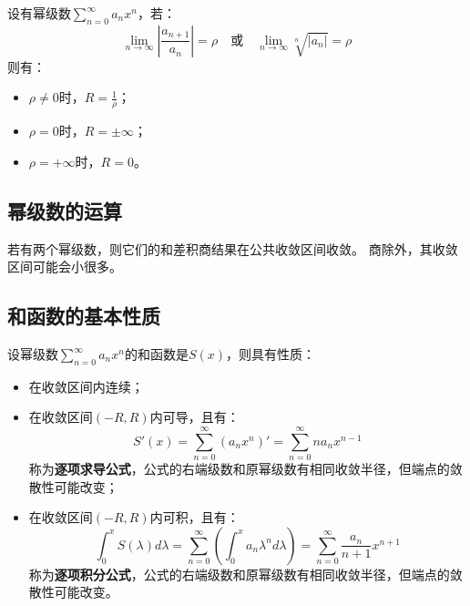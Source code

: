 \begin{theorem}[收敛半径定理]
设有幂级数$\sum_{n=0}^{\infty}{a_nx^n}$，若：
\[
\underset{n\rightarrow \infty}{\lim}\left| \frac{a_{n+1}}{a_n} \right|=\rho \quad \text{或} \quad \underset{n\rightarrow \infty}{\lim}\sqrt[n]{\left| a_n \right|}=\rho
\]
则有：
\begin{itemize}
    \item $\rho \ne 0$时，$R=\frac{1}{\rho}$；
    \item $\rho =0$时，$R=\pm \infty $；
    \item $\rho =+\infty $时，$R=0$。
\end{itemize}
\end{theorem}

\subsection{幂级数的运算}
若有两个幂级数，则它们的和差积商结果在公共收敛区间收敛。
商除外，其收敛区间可能会小很多。

\subsection{和函数的基本性质}

设幂级数$\sum_{n=0}^{\infty}{a_nx^n}$的和函数是$S\left( x \right) $，则具有性质：
\begin{itemize}
    \item 在收敛区间内连续；
    \item 在收敛区间$\left( -R,R \right) $内可导，且有：
    \[
    S'\left( x \right) =\sum_{n=0}^{\infty}{\left( a_nx^n \right) '}=\sum_{n=0}^{\infty}{na_nx^{n-1}}
    \]
    称为{\bf 逐项求导公式}，公式的右端级数和原幂级数有相同收敛半径，但端点的敛散性可能改变；
    \item 在收敛区间$\left( -R,R \right) $内可积，且有：
    \[
    \int_0^x{S\left( \lambda \right) d\lambda}=\sum_{n=0}^{\infty}{\left( \int_0^x{a_n\lambda ^nd\lambda} \right)}=\sum_{n=0}^{\infty}{\frac{a_n}{n+1}x^{n+1}}
    \]
    称为{\bf 逐项积分公式}，公式的右端级数和原幂级数有相同收敛半径，但端点的敛散性可能改变。
\end{itemize}




